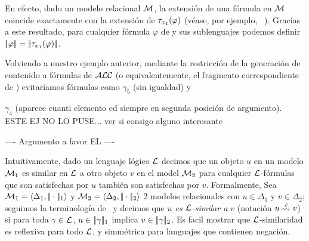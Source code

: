 En efecto, dado un modelo relacional $\mathcal{M}$, la extensi\'on de una f\'ormula \ALC en $\mathcal{M}$ coincide exactamente con la extensi\'on
 de $\mathit{\tau}_{x_1}(\varphi)$ (v\'ease, por ejemplo, ~\cite{baad:desc03}). Gracias
a este resultado, para cualquier f\'ormula $\varphi$ de \ALC y sus sublenguajes podemos definir 
$|\!|\varphi|\!| = |\!|\mathit{\tau}_{x_1}(\varphi)|\!|$.




 Volviendo a nuestro ejemplo anterior, mediante la restricci\'on de la generaci\'on de contenido
a f\'ormulas de $\mathcal{ALC}$ (o equivalentemente, el fragmento correspondiente de \FOL)
evitar\'iamos f\'ormulas como
$\gamma_5$ (sin igualdad) y

$\gamma_4$ (aparece cuanti elemento ed
siempre en segunda posici\'on de argumento). ESTE EJ NO LO PUSE... ver si consigo alguno interesante







----
Argumento a favor EL
----

Intuitivamente, dado un lenguaje l\'ogico $\mathcal{L}$ decimos que un objeto $u$ en un modelo
$\mathcal{M}_1$ es similar en $\mathcal{L}$ a otro objeto
 $v$ en el model $\mathcal{M}_2$ para cualquier $\mathcal{L}$-f\'ormulas que son satisfechas por $u$ tambi\'en son satisfechas por $v$. Formalmente,
Sea $\mathcal{M}_1 = \langle \Delta_1, |\!|\cdot|\!|_1 \rangle$ y $\mathcal{M}_2 = \langle \Delta_2, |\!|\cdot|\!|_2 \rangle$ 2 modelos relacionales con $u \in \Delta_1$ y $v \in \Delta_2$; seguimos la terminolog\'ia de~\cite{areces08} y decimos que
\emph{$u$ es $\mathcal{L}$-similar a $v$}  (notaci\'on $u \simil{\+L} v$) si para toda $\gamma \in \mathcal{L}$, $u \in |\!|\gamma|\!|_1$ implica
$v \in |\!|\gamma|\!|_2$. Es facil mostrar que
$\mathcal{L}$-similaridad es reflexiva para todo $\mathcal{L}$, y simm\'etrica  para languajes que contienen negaci\'on.


